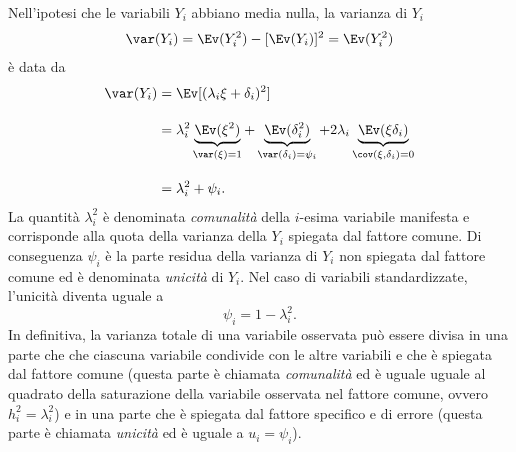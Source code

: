 Nell'ipotesi che le variabili $Y_i$ abbiano media nulla, la varianza di $Y_i$ 
\begin{align}
  \var(Y_i) = \Ev(Y_i^2) -[
  \Ev(Y_i)]^2=\Ev(Y_i^2)\notag
\end{align}
è data da
\begin{align}
  \var(Y_i) &= \Ev[(\lambda_i \xi +  \delta_i)^2 ]\notag\\[10pt]
  &=\lambda_i^2 \underbrace{\Ev(\xi^2) }_{\var(\xi)=1} +   \underbrace{ \Ev(\delta_i^2) }_{\var(\delta_i)=\psi_{i}} + 2\lambda_i \underbrace{ \Ev(\xi \delta_i) }_{\cov(\xi, \delta_{i})=0}\notag\\[10pt]
  &=\lambda^2_i + \psi_{i}.\notag
\end{align}
 La quantità $\lambda^2_i$ è denominata \textit{comunalità} della
  $i$-esima variabile manifesta e corrisponde alla quota della varianza della $Y_i$ spiegata dal fattore comune.
 Di conseguenza $\psi_{i}$ è la parte residua della varianza di $Y_i$ non spiegata dal fattore comune ed è denominata \textit{unicità} di $Y_i$. 
 Nel caso di variabili standardizzate, l'unicità diventa uguale a
\[
  \psi_{i}=1-\lambda^2_i.
\]
In definitiva, la varianza totale di una variabile osservata può essere divisa in 
una parte che che ciascuna variabile condivide con le altre variabili e che è spiegata dal fattore comune (questa parte è chiamata
\textit{comunalità} ed è uguale uguale al quadrato della saturazione della variabile osservata nel fattore comune, ovvero $h^2_i = \lambda_i^2$) e 
in una parte che è spiegata dal fattore specifico e di errore (questa parte è chiamata \textit{unicità} ed è uguale a $u_i = \psi_{i}$).

